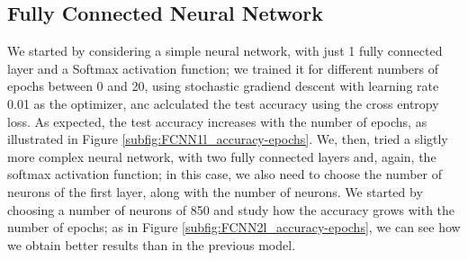 \documentclass[12pt]{article}
\begin{document}
\subsection{Fully Connected Neural Network}
We started by considering a simple neural network, with just 1 fully connected layer and a Softmax activation function; we trained it for different numbers of epochs between 0 and 20, using stochastic gradiend descent with learning rate 0.01 as the optimizer, anc aclculated the test accuracy using the cross entropy loss. As expected, the test accuracy increases with the number of epochs, as illustrated in Figure \ref{subfig:FCNN1l_accuracy-epochs}.\newline
We, then, tried a sligtly more complex neural network, with two fully connected layers and, again, the softmax activation function; in this case, we also need to choose the number of neurons of the first %
layer, along with the number of neurons. We started by choosing a number of neurons of 850 and study how the accuracy grows with the number of epochs; as in Figure \ref{subfig:FCNN2l_accuracy-epochs}, we can see how we obtain better results than in the previous model.\newline
\end{document}
